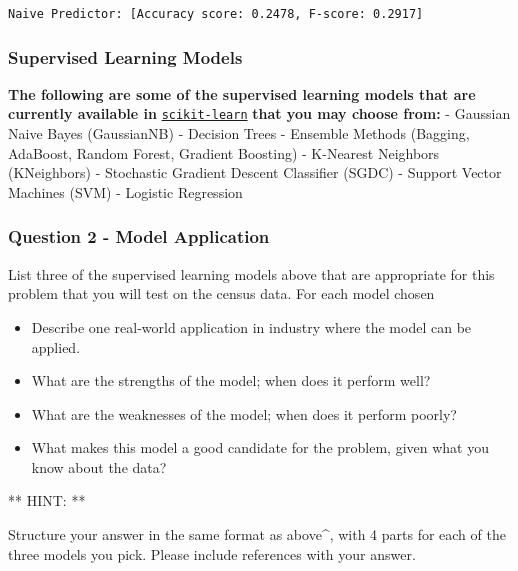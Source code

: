 \documentclass[11pt]{article}
\providecommand{\tightlist}{%
      \setlength{\itemsep}{0pt}\setlength{\parskip}{0pt}}
\begin{document}
    \begin{Verbatim}[commandchars=\\\{\}]
Naive Predictor: [Accuracy score: 0.2478, F-score: 0.2917]

    \end{Verbatim}

    \hypertarget{supervised-learning-models}{%
\subsubsection{Supervised Learning
Models}\label{supervised-learning-models}}

\textbf{The following are some of the supervised learning models that
are currently available in}
\href{http://scikit-learn.org/stable/supervised_learning.html}{\texttt{scikit-learn}}
\textbf{that you may choose from:} - Gaussian Naive Bayes (GaussianNB) -
Decision Trees - Ensemble Methods (Bagging, AdaBoost, Random Forest,
Gradient Boosting) - K-Nearest Neighbors (KNeighbors) - Stochastic
Gradient Descent Classifier (SGDC) - Support Vector Machines (SVM) -
Logistic Regression

    \hypertarget{question-2---model-application}{%
\subsubsection{Question 2 - Model
Application}\label{question-2---model-application}}

List three of the supervised learning models above that are appropriate
for this problem that you will test on the census data. For each model
chosen

\begin{itemize}
\tightlist
\item
  Describe one real-world application in industry where the model can be
  applied.
\item
  What are the strengths of the model; when does it perform well?
\item
  What are the weaknesses of the model; when does it perform poorly?
\item
  What makes this model a good candidate for the problem, given what you
  know about the data?
\end{itemize}

** HINT: **

Structure your answer in the same format as above\^{}, with 4 parts for
each of the three models you pick. Please include references with your
answer.
\end{document}
